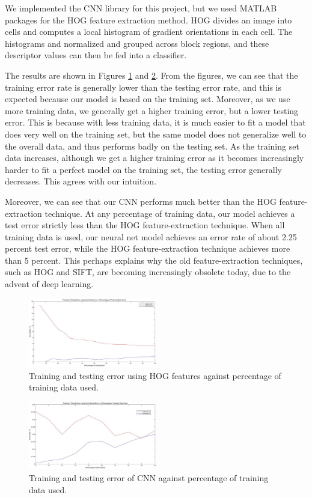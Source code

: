 \documentclass[10pt,twocolumn]{article}
\begin{document}
We implemented the CNN library for this project, but we used MATLAB packages for the HOG feature extraction method. HOG divides an image into cells and computes a local histogram of gradient orientations in each cell. The histograms and normalized and grouped across block regions, and these descriptor values can then be fed into a classifier.

The results are shown in Figures \ref{fig:hog} and \ref{fig:neural_net_percentage_data}. From the figures, we can see that the training error rate is generally lower than the testing error rate, and this is expected because our model is based on the training set. Moreover, as we use more training data, we generally get a higher training error, but a lower testing error. This is because with less training data, it is much easier to fit a model that does very well on the training set, but the same model does not generalize well to the overall data, and thus performs badly on the testing set. As the training set data increases, although we get a higher training error as it becomes increasingly harder to fit a perfect model on the training set, the testing error generally decreases. This agrees with our intuition.

Moreover, we can see that our CNN performs much better than the HOG feature-extraction technique. At any percentage of training data, our model achieves a test error strictly less than the HOG feature-extraction technique. When all training data is used, our neural net model achieves an error rate of about 2.25 percent test error, while the HOG feature-extraction technique achieves more than 5 percent. This perhaps explains why the old feature-extraction techniques, such as HOG and SIFT, are becoming increasingly obsolete today, due to the advent of deep learning.

\begin{figure}
\includegraphics[width = 0.5\textwidth]{figure/hog}
\caption{Training and testing error using HOG features against percentage of training data used.}
\label{fig:hog}
\end{figure}

\begin{figure}
\includegraphics[width = 0.5\textwidth]{figure/neural_net_percentage_data}
\caption{Training and testing error of CNN against percentage of training data used.}
\label{fig:neural_net_percentage_data}
\end{figure}
\end{document}
